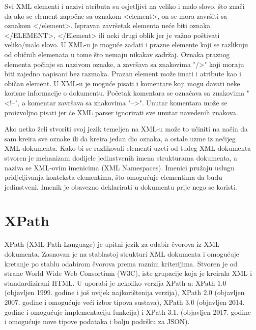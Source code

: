 \documentclass{foi}
\begin{document}
Svi XML elementi i nazivi atributa su osjetljivi na veliko i malo slovo, što znači da ako se element započne sa oznakom <element>, on se mora završiti sa oznakom </element>. Ispravan završetak elementa neće biti oznaka </ELEMENT>, </Element> ili neki drugi oblik jer je važno poštivati veliko/malo slovo. U XML-u je moguće zadati i prazne elemente koji se razlikuju od običnih elemenata u tome što nemaju nikakav sadržaj. Oznaka praznog elementa počinje sa nazivom oznake, a završava sa znakovima "/>" koji moraju biti zajedno napisani bez razmaka. Prazan element može imati i atribute kao i običan element. U XML-u je moguće pisati i komentare koji mogu davati neke korisne informacije o dokumentu. Početak komentara se označava sa znakovima "<!--", a komentar završava sa znakovima "-->". Unutar komentara može se proizvoljno pisati jer će XML parser ignorirati sve unutar navedenih znakova. \cite{xmlSoapProgramming}

Ako netko želi stvoriti svoj jezik temeljen na XML-u može to učiniti na način da sam kreira sve oznake ili da kreira jedan dio oznaka, a ostale uzme iz nečijeg XML dokumenta. Kako bi se razlikovali elementi uzeti od tuđeg XML dokumenta stvoren je mehanizam dodijele jedinstvenih imena strukturama dokumenta, a naziva se XML-ovim imenicima (XML Namespaces). Imenici pružaju uslugu pridjeljivanja konteksta elementima, što omogućuje elementima da budu jedinstveni. Imenik je obavezno deklarirati u dokumentu prije nego se koristi.

\section{XPath}

XPath (XML Path Language) je upitni jezik za odabir čvorova iz XML dokumenta. Zasnovan je na stablastoj strukturi XML dokumenta i omogućuje kretanje po stablu odabirom čvorova prema raznim kriterijima. Stvoren je od strane World Wide Web Consortium (W3C), iste grupacije koja je kreirala XML i standardizirani HTML. U uporabi je nekoliko verzija XPath-a: XPath 1.0 (objavljen 1999. godine i još uvijek najkorištenija verzija), XPath 2.0 (objavljen 2007. godine  i omogućuje veći izbor tipova sustava), XPath 3.0 (objavljen 2014. godine i omogućuje implementaciju funkcija) i XPath 3.1. (objavljen 2017. godine i omogućuje nove tipove podataka i bolju podršku za JSON).
\end{document}
